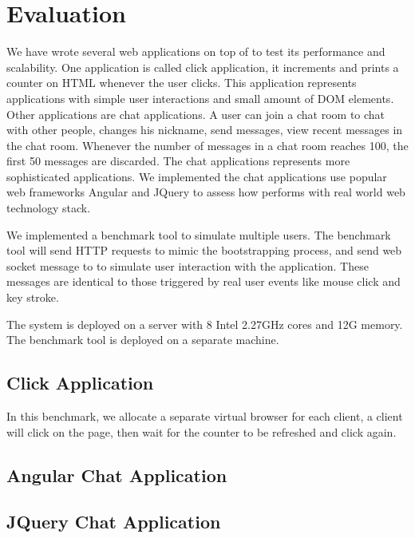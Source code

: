 \section{Evaluation}
\label{sec:eval}
We have wrote several web applications on top of \cb{} to test its
performance and scalability.
One application is called click application,
it increments and prints a counter on HTML whenever the user clicks.
This application represents applications with simple user interactions and small amount of DOM elements.
Other applications are chat applications.
A user can join a chat room to chat with other people,
changes his nickname, send messages, view recent messages in the chat room.
Whenever the number of messages in a chat room reaches 100, the first 50 messages
are discarded.
The chat applications represents more sophisticated applications.
We implemented the chat applications use popular web frameworks Angular and JQuery
to assess how \cb{} performs with real world web technology stack.

We implemented a benchmark tool to simulate multiple users.
The benchmark tool will send HTTP requests to mimic the bootstrapping process,
and send web socket message to \cb{} to simulate user interaction with the application.
These messages are identical to those triggered by real user events like mouse click and key stroke.

The \cb{} system is deployed on a server with 8 Intel 2.27GHz cores and 12G memory.
The benchmark tool is deployed on a separate machine.

\subsection{Click Application}
In this benchmark,
we allocate a separate virtual browser for each client,
a client will click on the page, then wait for the counter to be refreshed and click again.


\clickscaleout{}

\clickwaitscaleout{}

\subsection{Angular Chat Application}


\subsection{JQuery Chat Application}

\jquerychatscaleout{}